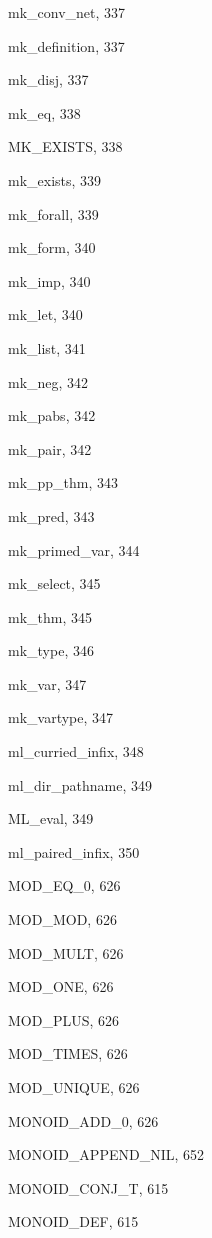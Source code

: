 \begin{theindex}
  \item {\ptt mk\_conv\_net}, 337
  \item {\ptt mk\_definition}, 337
  \item {\ptt mk\_disj}, 337
  \item {\ptt mk\_eq}, 338
  \item {\ptt MK\_EXISTS}, 338
  \item {\ptt mk\_exists}, 339
  \item {\ptt mk\_forall}, 339
  \item {\ptt mk\_form}, 340
  \item {\ptt mk\_imp}, 340
  \item {\ptt mk\_let}, 340
  \item {\ptt mk\_list}, 341
  \item {\ptt mk\_neg}, 342
  \item {\ptt mk\_pabs}, 342
  \item {\ptt mk\_pair}, 342
  \item {\ptt mk\_pp\_thm}, 343
  \item {\ptt mk\_pred}, 343
  \item {\ptt mk\_primed\_var}, 344
  \item {\ptt mk\_select}, 345
  \item {\ptt mk\_thm}, 345
  \item {\ptt mk\_type}, 346
  \item {\ptt mk\_var}, 347
  \item {\ptt mk\_vartype}, 347
  \item {\ptt ml\_curried\_infix}, 348
  \item {\ptt ml\_dir\_pathname}, 349
  \item {\ptt ML\_eval}, 349
  \item {\ptt ml\_paired\_infix}, 350
  \item {\ptt MOD\_EQ\_0}, 626
  \item {\ptt MOD\_MOD}, 626
  \item {\ptt MOD\_MULT}, 626
  \item {\ptt MOD\_ONE}, 626
  \item {\ptt MOD\_PLUS}, 626
  \item {\ptt MOD\_TIMES}, 626
  \item {\ptt MOD\_UNIQUE}, 626
  \item {\ptt MONOID\_ADD\_0}, 626
  \item {\ptt MONOID\_APPEND\_NIL}, 652
  \item {\ptt MONOID\_CONJ\_T}, 615
  \item {\ptt MONOID\_DEF}, 615

\end{theindex}

